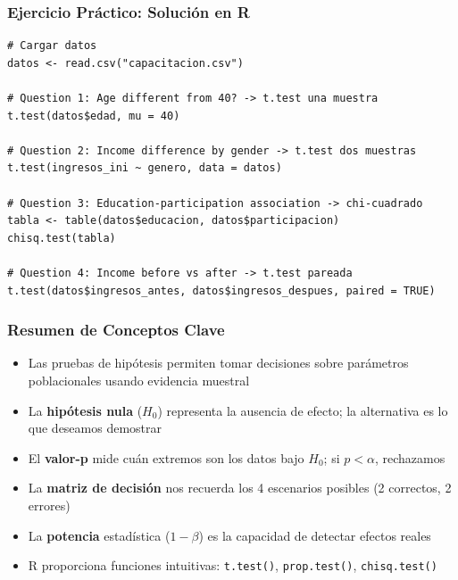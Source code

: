 \documentclass[aspectratio=169,11pt]{beamer}
\newcommand{\highlight}[1]{\textcolor{uddlight}{\bfseries #1}}
\begin{document}
\begin{frame}[fragile]
  \frametitle{Ejercicio Pr\'actico: Soluci\'on en R}
  \tiny
  \begin{lstlisting}
# Cargar datos
datos <- read.csv("capacitacion.csv")

# Question 1: Age different from 40? -> t.test una muestra
t.test(datos$edad, mu = 40)

# Question 2: Income difference by gender -> t.test dos muestras
t.test(ingresos_ini ~ genero, data = datos)

# Question 3: Education-participation association -> chi-cuadrado
tabla <- table(datos$educacion, datos$participacion)
chisq.test(tabla)

# Question 4: Income before vs after -> t.test pareada
t.test(datos$ingresos_antes, datos$ingresos_despues, paired = TRUE)
  \end{lstlisting}
\end{frame}

\begin{frame}
  \frametitle{Resumen de Conceptos Clave}
  \small
  \begin{itemize}
    \setlength{\itemsep}{5pt}
    \item Las pruebas de hip\'otesis permiten tomar decisiones sobre par\'ametros poblacionales
      usando evidencia muestral

    \item La \highlight{hip\'otesis nula} ($H_0$) representa la ausencia de efecto; la alternativa
      es lo que deseamos demostrar

    \item El \highlight{valor-p} mide cu\'an extremos son los datos bajo $H_0$; si $p < \alpha$, rechazamos

    \item La \highlight{matriz de decisi\'on} nos recuerda los 4 escenarios posibles (2 correctos, 2 errores)

    \item La \highlight{potencia} estad\'istica ($1-\beta$) es la capacidad de detectar efectos reales

    \item R proporciona funciones intuitivas: \texttt{t.test()}, \texttt{prop.test()}, \texttt{chisq.test()}
  \end{itemize}
\end{frame}
\end{document}
